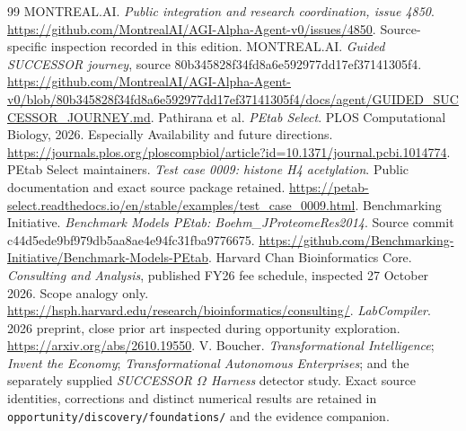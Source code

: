\documentclass[11pt,letterpaper]{article}
\begin{document}
\begin{thebibliography}{99}
 MONTREAL.AI. \emph{Public integration and research coordination, issue 4850}. \url{https://github.com/MontrealAI/AGI-Alpha-Agent-v0/issues/4850}. Source-specific inspection recorded in this edition.
 MONTREAL.AI. \emph{Guided SUCCESSOR journey}, source 80b345828f34fd8a6e592977dd17ef37141305f4. \url{https://github.com/MontrealAI/AGI-Alpha-Agent-v0/blob/80b345828f34fd8a6e592977dd17ef37141305f4/docs/agent/GUIDED_SUCCESSOR_JOURNEY.md}.
 Pathirana et al. \emph{PEtab Select}. PLOS Computational Biology, 2026. Especially Availability and future directions. \url{https://journals.plos.org/ploscompbiol/article?id=10.1371/journal.pcbi.1014774}.
 PEtab Select maintainers. \emph{Test case 0009: histone H4 acetylation}. Public documentation and exact source package retained. \url{https://petab-select.readthedocs.io/en/stable/examples/test_case_0009.html}.
 Benchmarking Initiative. \emph{Benchmark Models PEtab: Boehm\_JProteomeRes2014}. Source commit c44d5ede9bf979db5aa8ae4e94fc31fba9776675. \url{https://github.com/Benchmarking-Initiative/Benchmark-Models-PEtab}.
 Harvard Chan Bioinformatics Core. \emph{Consulting and Analysis}, published FY26 fee schedule, inspected 27 October 2026. Scope analogy only. \url{https://hsph.harvard.edu/research/bioinformatics/consulting/}.
 \emph{LabCompiler}. 2026 preprint, close prior art inspected during opportunity exploration. \url{https://arxiv.org/abs/2610.19550}.
 V. Boucher. \emph{Transformational Intelligence}; \emph{Invent the Economy}; \emph{Transformational Autonomous Enterprises}; and the separately supplied \emph{SUCCESSOR $\Omega$ Harness} detector study. Exact source identities, corrections and distinct numerical results are retained in \texttt{opportunity/discovery/foundations/} and the evidence companion.

\end{thebibliography}
\end{document}
